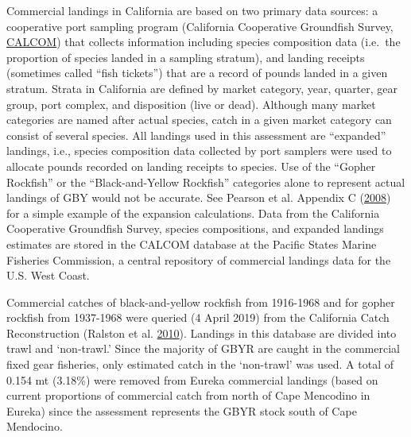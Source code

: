 \documentclass[12pt,]{article}
\begin{document}
Commercial landings in California are based on two primary data sources:
a cooperative port sampling program (California Cooperative Groundfish
Survey, \href{https://calcom.psmfc.org/}{CALCOM}) that collects
information including species composition data (i.e.~the proportion of
species landed in a sampling stratum), and landing receipts (sometimes
called ``fish tickets'') that are a record of pounds landed in a given
stratum. Strata in California are defined by market category, year,
quarter, gear group, port complex, and disposition (live or dead).
Although many market categories are named after actual species, catch in
a given market category can consist of several species. All landings
used in this assessment are ``expanded'' landings, i.e., species
composition data collected by port samplers were used to allocate pounds
recorded on landing receipts to species. Use of the ``Gopher Rockfish''
or the ``Black-and-Yellow Rockfish'' categories alone to represent
actual landings of GBY would not be accurate. See Pearson et al.
Appendix C (\protect\hyperlink{ref-Pearson2008}{2008}) for a simple
example of the expansion calculations. Data from the California
Cooperative Groundfish Survey, species compositions, and expanded
landings estimates are stored in the CALCOM database at the Pacific
States Marine Fisheries Commission, a central repository of commercial
landings data for the U.S. West Coast.

Commercial catches of black-and-yellow rockfish from 1916-1968 and for
gopher rockfish from 1937-1968 were queried (4 April 2019) from the
California Catch Reconstruction (Ralston et al.
\protect\hyperlink{ref-Ralston2010}{2010}). Landings in this database
are divided into trawl and `non-trawl.' Since the majority of GBYR are
caught in the commercial fixed gear fisheries, only estimated catch in
the `non-trawl' was used. A total of 0.154 mt (3.18\%) were removed from
Eureka commercial landings (based on current proportions of commercial
catch from north of Cape Mencodino in Eureka) since the assessment
represents the GBYR stock south of Cape Mendocino.
\end{document}

